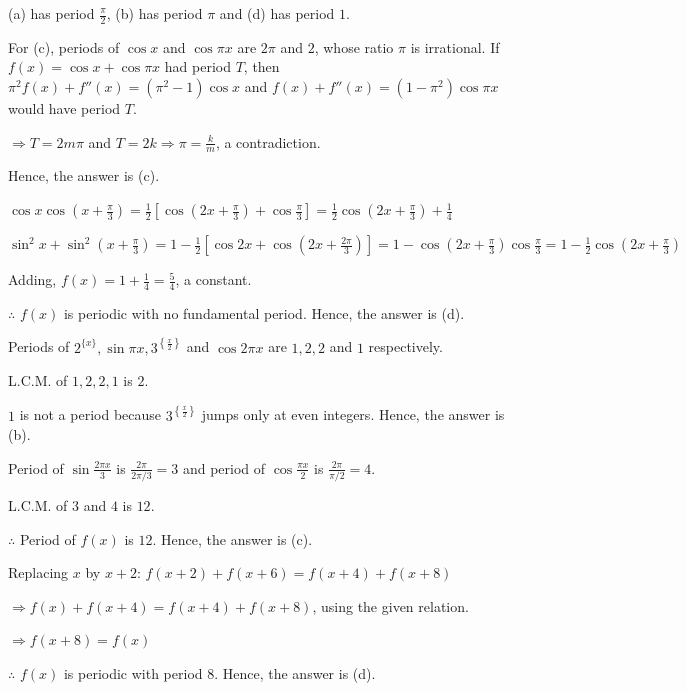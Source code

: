\item (a) has period $\frac{\pi}{2}$, (b) has period $\pi$ and (d) has period $1$.

  For (c), periods of $\cos x$ and $\cos\pi x$ are $2\pi$ and $2$, whose ratio $\pi$ is irrational.
  If $f(x) = \cos x + \cos\pi x$ had period $T$, then $\pi^2f(x) + f''(x) = (\pi^2 - 1)\cos x$ and
  $f(x) + f''(x) = (1 - \pi^2)\cos\pi x$ would have period $T$.

  $\Rightarrow T = 2m\pi$ and $T = 2k \Rightarrow \pi = \frac{k}{m}$, a contradiction.

  Hence, the answer is (c).

\item $\cos x\cos\left(x + \frac{\pi}{3}\right) = \frac{1}{2}\left[\cos\left(2x + \frac{\pi}{3}\right) +
  \cos\frac{\pi}{3}\right] = \frac{1}{2}\cos\left(2x + \frac{\pi}{3}\right) + \frac{1}{4}$

  $\sin^2x + \sin^2\left(x + \frac{\pi}{3}\right) = 1 - \frac{1}{2}\left[\cos2x + \cos\left(2x +
  \frac{2\pi}{3}\right)\right] = 1 - \cos\left(2x + \frac{\pi}{3}\right)\cos\frac{\pi}{3} = 1 -
  \frac{1}{2}\cos\left(2x + \frac{\pi}{3}\right)$

  Adding, $f(x) = 1 + \frac{1}{4} = \frac{5}{4}$, a constant.

  $\therefore$ $f(x)$ is periodic with no fundamental period. Hence, the answer is (d).

\item Periods of $2^{\{x\}}, \sin\pi x, 3^{\left\{\frac{x}{2}\right\}}$ and $\cos2\pi x$ are $1, 2, 2$
  and $1$ respectively.

  L.C.M. of $1, 2, 2, 1$ is $2$.

  $1$ is not a period because $3^{\left\{\frac{x}{2}\right\}}$ jumps only at even integers. Hence,
  the answer is (b).

\item Period of $\sin\frac{2\pi x}{3}$ is $\frac{2\pi}{2\pi/3} = 3$ and period of $\cos\frac{\pi
  x}{2}$ is $\frac{2\pi}{\pi/2} = 4$.

  L.C.M. of $3$ and $4$ is $12$.

  $\therefore$ Period of $f(x)$ is $12$. Hence, the answer is (c).

\item Replacing $x$ by $x + 2$: $f(x + 2) + f(x + 6) = f(x + 4) + f(x + 8)$

  $\Rightarrow f(x) + f(x + 4) = f(x + 4) + f(x + 8)$, using the given relation.

  $\Rightarrow f(x + 8) = f(x)$

  $\therefore$ $f(x)$ is periodic with period $8$. Hence, the answer is (d).
\stopitemize
